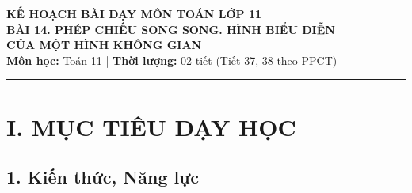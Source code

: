 \documentclass[12pt, a4paper]{article}
\begin{document}
\begin{center}
    {\Large \textbf{KẾ HOẠCH BÀI DẠY MÔN TOÁN LỚP 11}}\\[0.4em]
    {\LARGE \textbf{BÀI 14. PHÉP CHIẾU SONG SONG. HÌNH BIỂU DIỄN}}\\[0.3em]
    {\LARGE \textbf{CỦA MỘT HÌNH KHÔNG GIAN}}\\[0.5em]
    \textbf{Môn học:} Toán 11 | \textbf{Thời lượng:} 02 tiết (Tiết 37, 38 theo PPCT)
\end{center}

\vspace{0.5em}
\hrule
\vspace{1em}

\section*{I. MỤC TIÊU DẠY HỌC}

\subsection*{1. Kiến thức, Năng lực}
\end{document}
